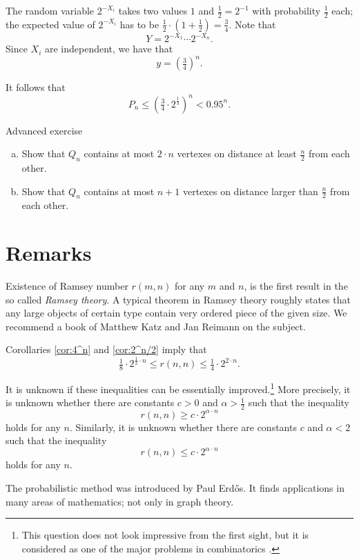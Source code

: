 The random variable $2^{-X_i}$ takes two values $1$ and $\tfrac12=2^{-1}$ with probability $\tfrac12$ each;
the expected value of $2^{-X_i}$ has to be $\tfrac12\cdot (1+\tfrac12)=\tfrac 34$.
Note that 
\[Y=2^{-X_1}\cdots 2^{-X_n}.\]
Since $X_i$ are independent, we have that
\[y=\left(\tfrac34\right)^n.\]

It follows that 
\[P_n\le \left(\tfrac34\cdot 2^{\frac13}\right)^n< 0.95^n.\]
\qedsf

\pagebreak[1]
\begin{thm}{Advanced exercise}\label{ex:lin-Qn}
\begin{enumerate}[(a)]
\item Show that $Q_n$ contains at most $2\cdot n$ vertexes on distance at least $\tfrac n2$ from each other. 
\item Show that $Q_n$ contains at most $n+1$ vertexes on distance larger than $\tfrac n2$ from each other. 
\end{enumerate}
\end{thm}
 

\section*{Remarks}

Existence of Ramsey number $r(m,n)$ for any $m$ and $n$, is the first result in the so called \emph{Ramsey theory}. 
A typical theorem in Ramsey theory roughly states that any large objects of certain type contain very ordered piece of the given size.
We recommend a book of Matthew Katz and Jan Reimann \cite{katz-reimann} on the subject. 

Corollaries \ref{cor:4^n} and \ref{cor:2^n/2} imply that 
\[\tfrac18\cdot 2^{\frac12\cdot n}\le r(n,n)\le \tfrac14\cdot 2^{2\cdot n}.\]

It is unknown if these inequalities can be essentially improved.\footnote{This question does not look impressive from the first sight, but it is considered as one of the major problems in combinatorics \cite{gowers}.}
More precisely, it is unknown whether there are constants $c>0$ and $\alpha>\tfrac12$ such that the inequality
\[r(n,n)\ge c\cdot 2^{\alpha\cdot n}\]
holds for any $n$.
Similarly, it is unknown whether there are constants $c$ and $\alpha<2$ such that the inequality
\[r(n,n)\le c\cdot 2^{\alpha\cdot n}\]
holds for any $n$.

The probabilistic method was introduced by Paul Erd\H os.
It  finds applications in many areas of mathematics; not only in graph theory.


